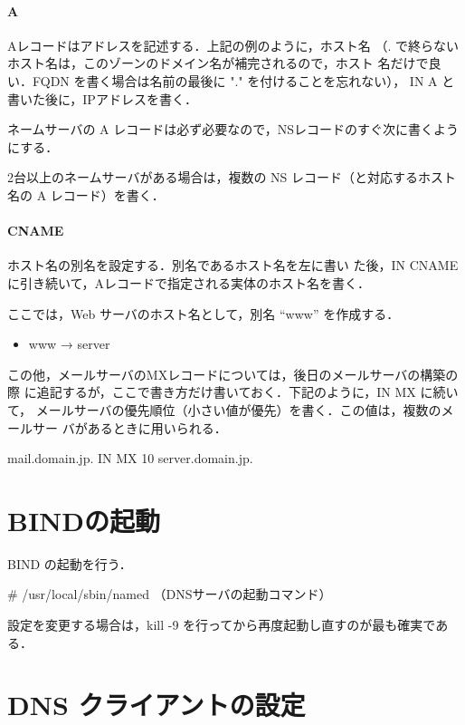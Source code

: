 \paragraph{A} Aレコードはアドレスを記述する．上記の例のように，ホスト名
（. で終らないホスト名は，このゾーンのドメイン名が補完されるので，ホスト
名だけで良い．FQDN を書く場合は名前の最後に "." を付けることを忘れない），
IN A と書いた後に，IPアドレスを書く．

ネームサーバの A レコードは必ず必要なので，NSレコードのすぐ次に書くよう
にする．

2台以上のネームサーバがある場合は，複数の NS レコード（と対応するホスト
名の A レコード）を書く．

\paragraph{CNAME} ホスト名の別名を設定する．別名であるホスト名を左に書い
た後，IN CNAME に引き続いて，Aレコードで指定される実体のホスト名を書く．

ここでは，Web サーバのホスト名として，別名 ``www'' を作成する．

\begin{itemize}
 \item www → server
\end{itemize}

この他，メールサーバのMXレコードについては，後日のメールサーバの構築の際
に追記するが，ここで書き方だけ書いておく．下記のように，IN MX に続いて，
メールサーバの優先順位（小さい値が優先）を書く．この値は，複数のメールサー
バがあるときに用いられる．

\begin{cli}
mail.domain.jp.        IN   MX  10       server.domain.jp.
\end{cli}

\section{BINDの起動}

BIND の起動を行う．

\begin{cli}
# /usr/local/sbin/named  （DNSサーバの起動コマンド）
\end{cli}

設定を変更する場合は，kill -9 を行ってから再度起動し直すのが最も確実であ
る．

\section{DNS クライアントの設定}

